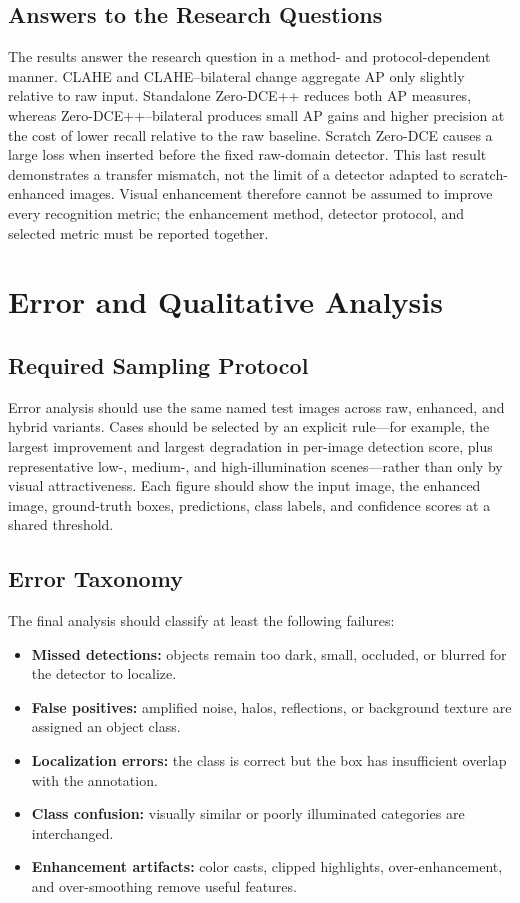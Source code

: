 \documentclass[11pt,a4paper]{article}
\begin{document}
\subsection{Answers to the Research Questions}

The results answer the research question in a method- and protocol-dependent
manner. CLAHE and CLAHE--bilateral change aggregate AP only slightly relative to
raw input. Standalone Zero-DCE++ reduces both AP measures, whereas
Zero-DCE++--bilateral produces small AP gains and higher precision at the cost
of lower recall relative to the raw baseline. Scratch Zero-DCE causes a large
loss when inserted before the
fixed raw-domain detector. This last result demonstrates a transfer mismatch,
not the limit of a detector adapted to scratch-enhanced images. Visual
enhancement therefore cannot be assumed to improve every recognition metric;
the enhancement method, detector protocol, and selected metric must be reported
together.

\section{Error and Qualitative Analysis}

\subsection{Required Sampling Protocol}

Error analysis should use the same named test images across raw, enhanced, and
hybrid variants. Cases should be selected by an explicit rule---for example,
the largest improvement and largest degradation in per-image detection score,
plus representative low-, medium-, and high-illumination scenes---rather than
only by visual attractiveness. Each figure should show the input image, the
enhanced image, ground-truth boxes, predictions, class labels, and confidence
scores at a shared threshold.

\subsection{Error Taxonomy}

The final analysis should classify at least the following failures:

\begin{itemize}
    \item \textbf{Missed detections:} objects remain too dark, small, occluded,
    or blurred for the detector to localize.
    \item \textbf{False positives:} amplified noise, halos, reflections, or
    background texture are assigned an object class.
    \item \textbf{Localization errors:} the class is correct but the box has
    insufficient overlap with the annotation.
    \item \textbf{Class confusion:} visually similar or poorly illuminated
    categories are interchanged.
    \item \textbf{Enhancement artifacts:} color casts, clipped highlights,
    over-enhancement, and over-smoothing remove useful features.
\end{itemize}
\end{document}
